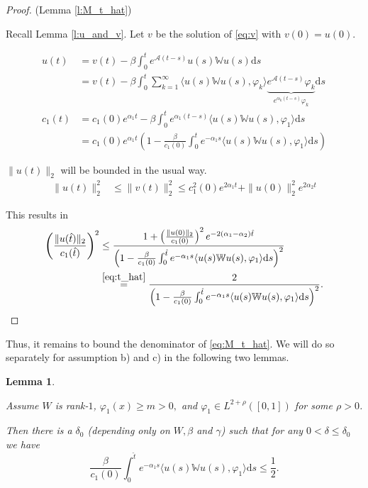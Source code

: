 \documentclass{article}
\renewcommand{\d}{\mathrm{d}}
\newcommand{\W}{\mathbb{W}}
\newcommand{\1}[1]{{\mathds{1}}_{\left\{#1\right\}}}
\newtheorem{lemma}{Lemma}
\begin{document}
\begin{proof}(Lemma \ref{l:M_t_hat})

Recall Lemma \ref{l:u_and_v}. Let $v$ be the solution of \eqref{eq:v} with $v(0)=u(0).$

\begin{align*}
	u(t)&=v(t)-\beta\int_{0}^{t}e^{\mathcal{A}(t-s)}u(s)\W u(s) \d s\\
	&=v(t)-\beta\int_{0}^{t}\sum_{k=1}^{\infty}\langle u(s)\W u(s), \varphi_k \rangle \underbrace{e^{\mathcal{A}(t-s)} \varphi_k}_{e^{\alpha_k(t-s)}\varphi_k}  \d s\\
	c_1(t)&=c_1(0)e^{\alpha_1 t}-\beta\int_{0}^{t}e^{\alpha_1(t-s)}\langle u(s)\W u(s), \varphi_1 \rangle \d s \\
	&=c_1(0)e^{\alpha_1 t} \left(1-\frac{\beta}{c_1(0)}\int_{0}^{t}e^{-\alpha_1 s}\langle u(s)\W u(s), \varphi_1 \rangle \d s \right)
\end{align*}

$\|u(t) \|_2$ will be bounded in the usual way.
\begin{align*}
	\| u(t)\|_2^2 & \leq \| v(t)\|_2^2 \leq c_1^2(0)e^{2\alpha_1 t}+\|u(0) \|_2^2e^{2 \alpha_2 t}
\end{align*}

This results in
\begin{align*}
	\left(\frac{\|u(\hat{t}) \|_2}{c_1(\hat{t})}\right)^2 &\leq \frac{1+\left(\frac{\| u(0)\|_2}{c_1(0)}\right)^2e^{-2(\alpha_1-\alpha_2)\hat{t}}}{\left(1-\frac{\beta}{c_1(0)}\int_{0}^{\hat{t}}e^{-\alpha_1 s}\langle u(s)\W u(s), \varphi_1 \rangle \d s \right)^2} \\
	& \overset{\eqref{eq:t_hat}}{=} \frac{2}{\left(1-\frac{\beta}{c_1(0)}\int_{0}^{\hat{t}}e^{-\alpha_1 s}\langle u(s)\W u(s), \varphi_1 \rangle \d s \right)^2}. 
\end{align*}
\end{proof}

Thus, it remains to bound the denominator of \eqref{eq:M_t_hat}. We will do so separately for assumption b) and c) in the following two lemmas.


\begin{lemma}
\label{l:rank_1}	
	
Assume $W$ is rank-$1$, $\varphi_1(x) \geq m>0,$ and $\varphi_1 \in L^{2+\rho}([0,1])$ for some $\rho>0$. 


Then there is a $\delta_0$ (depending only on $W,\beta$ and $\gamma$) such that for any $0<\delta \leq \delta_0$ we have
$$\frac{\beta}{c_1(0)}\int_{0}^{\hat{t}}e^{-\alpha_1 s} \langle u(s)\W u(s), \varphi_1 \rangle \d s \leq \frac{1}{2}. $$
\end{lemma}
\end{document}
